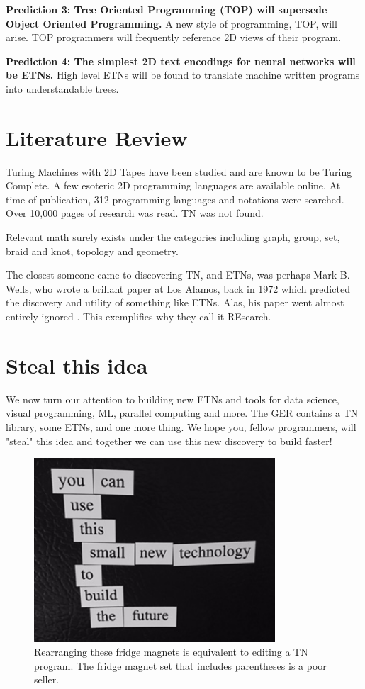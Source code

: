 \documentclass[journal]{IEEEtran}
\begin{document}
\textbf{Prediction 3: Tree Oriented Programming (TOP) will supersede Object Oriented Programming.} A new style of programming, TOP, will arise. TOP programmers will frequently reference 2D views of their program.

\textbf{Prediction 4: The simplest 2D text encodings for neural networks will be ETNs.} High level ETNs will be found to translate machine written programs into understandable trees.

\section{Literature Review}

Turing Machines with 2D Tapes have been studied and are known to be Turing Complete\cite{Toida}. A few esoteric 2D programming languages are available online\cite{Ender}. At time of publication, 312 programming languages and notations were searched. Over 10,000 pages of research was read. TN was not found.

Relevant math surely exists under the categories including graph, group, set, braid and knot, topology and geometry.

The closest someone came to discovering TN, and ETNs, was perhaps Mark B. Wells, who wrote a brillant paper at Los Alamos, back in 1972 which predicted the discovery and utility of something like ETNs. Alas, his paper went almost entirely ignored \cite{Wells}. This exemplifies why they call it REsearch.

\section{Steal this idea}

We now turn our attention to building new ETNs and tools for data science, visual programming, ML, parallel computing and more. The GER contains a TN library, some ETNs, and one more thing. We hope you, fellow programmers, will "steal" this idea and together we can use this new discovery to build faster!
\begin{figure}[ht!]
\centering
\includegraphics[width=90mm]{tree.jpg}
\caption{Rearranging these fridge magnets is equivalent to editing a TN program. The fridge magnet set that includes parentheses is a poor seller.}
\end{figure}
\end{document}
